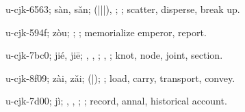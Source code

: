 \begin{multicols}{2}
{\cjkgGlue{}u-cjk-6563; sàn, sǎn; \cjkgGlue{}\cjkgGlue{}(\cjkgGlue{}|\cjkgGlue{}|\cjkgGlue{}|\cjkgGlue{}), \cjkgGlue{}; \cjkgGlue{}; scatter, disperse, break up.

\cjkgGlue{}u-cjk-594f; zòu; \cjkgGlue{}\cjkgGlue{}\cjkgGlue{}; \cjkgGlue{}; memorialize emperor, report.

\cjkgGlue{}u-cjk-7bc0; jié, jiē; \cjkgGlue{}, \cjkgGlue{}, \cjkgGlue{}; \cjkgGlue{}, \cjkgGlue{}; knot, node, joint, section.

\cjkgGlue{}u-cjk-8f09; zài, zǎi; \cjkgGlue{}\cjkgGlue{}(\cjkgGlue{}|\cjkgGlue{}); \cjkgGlue{}; load, carry, transport, convey.

\cjkgGlue{}u-cjk-7d00; jì; \cjkgGlue{}, \cjkgGlue{}, \cjkgGlue{}; \cjkgGlue{}; record, annal, historical account.

}
\end{multicols}
